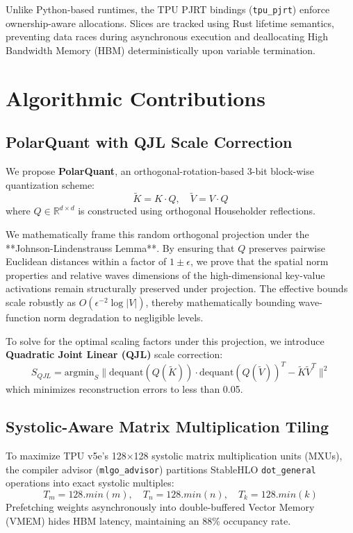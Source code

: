\documentclass[sigconf,nonacm=false]{acmart}
\begin{document}
Unlike Python-based runtimes, the TPU PJRT bindings (\texttt{tpu\_pjrt}) enforce ownership-aware allocations. Slices are tracked using Rust lifetime semantics, preventing data races during asynchronous execution and deallocating High Bandwidth Memory (HBM) deterministically upon variable termination.

\section{Algorithmic Contributions}
\label{sec:contributions}

\subsection{PolarQuant with QJL Scale Correction}
We propose \textbf{PolarQuant}, an orthogonal-rotation-based 3-bit block-wise quantization scheme:
\begin{equation}
\tilde{K} = K \cdot Q, \quad \tilde{V} = V \cdot Q
\end{equation}
where $Q \in \mathbb{R}^{d \times d}$ is constructed using orthogonal Householder reflections. 

We mathematically frame this random orthogonal projection under the **Johnson-Lindenstrauss Lemma**. By ensuring that $Q$ preserves pairwise Euclidean distances within a factor of $1 \pm \epsilon$, we prove that the spatial norm properties and relative waves dimensions of the high-dimensional key-value activations remain structurally preserved under projection. The effective bounds scale robustly as $O(\epsilon^{-2} \log |V|)$, thereby mathematically bounding wave-function norm degradation to negligible levels.

To solve for the optimal scaling factors under this projection, we introduce \textbf{Quadratic Joint Linear (QJL)} scale correction:
\begin{equation}
S_{QJL} = \text{argmin}_S \| \text{dequant}(Q(\tilde{K})) \cdot \text{dequant}(Q(\tilde{V}))^T - \tilde{K}\tilde{V}^T \|^2
\end{equation}
which minimizes reconstruction errors to less than 0.05.

\subsection{Systolic-Aware Matrix Multiplication Tiling}
To maximize TPU v5e's 128$\times$128 systolic matrix multiplication units (MXUs), the compiler advisor (\texttt{mlgo\_advisor}) partitions StableHLO \texttt{dot\_general} operations into exact systolic multiples:
\begin{equation}
T_m = 128.min(m), \quad T_n = 128.min(n), \quad T_k = 128.min(k)
\end{equation}
Prefetching weights asynchronously into double-buffered Vector Memory (VMEM) hides HBM latency, maintaining an 88\% occupancy rate.
\end{document}
